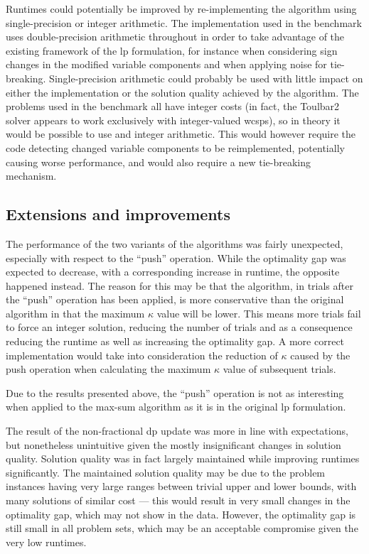 Runtimes could potentially be improved by re-implementing the algorithm using single-precision or integer arithmetic.
The implementation used in the benchmark uses double-precision arithmetic throughout in order to take advantage of the existing framework of the \gls{lp} formulation, for instance when considering sign changes in the modified variable components and when applying noise for tie-breaking.
Single-precision arithmetic could probably be used with little impact on either the implementation or the solution quality achieved by the algorithm.
The problems used in the benchmark all have integer costs (in fact, the Toulbar2 solver appears to work exclusively with integer-valued \glspl{wcsp}), so in theory it would be possible to use and integer arithmetic.
This would however require the code detecting changed variable components to be reimplemented, potentially causing worse performance, and would also require a new tie-breaking mechanism.


\subsection{Extensions and improvements}
The performance of the two variants of the algorithms was fairly unexpected, especially with respect to the \enquote{push} operation.
While the optimality gap was expected to decrease, with a corresponding increase in runtime, the opposite happened instead.
The reason for this may be that the algorithm, in trials after the \enquote{push} operation has been applied, is more conservative than the original algorithm in that the maximum \(\kappa\) value will be lower. This means more trials fail to force an integer solution, reducing the number of trials and as a consequence reducing the runtime as well as increasing the optimality gap.
A more correct implementation would take into consideration the reduction of \(\kappa\) caused by the push operation when calculating the maximum \(\kappa\) value of subsequent trials.

Due to the results presented above, the \enquote{push} operation is not as interesting when applied to the max-sum algorithm as it is in the original \gls{lp} formulation.

The result of the non-fractional \gls{dp} update was more in line with expectations, but nonetheless unintuitive given the mostly insignificant changes in solution quality.
Solution quality was in fact largely maintained while improving runtimes significantly.
The maintained solution quality may be due to the problem instances having very large ranges between trivial upper and lower bounds, with many solutions of similar cost --- this would result in very small changes in the optimality gap, which may not show in the data.
However, the optimality gap is still small in all problem sets, which may be an acceptable compromise given the very low runtimes.

